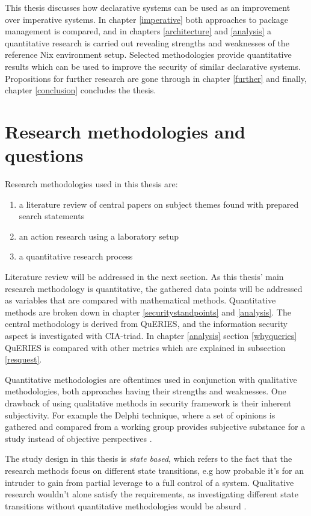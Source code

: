 This thesis discusses how declarative systems can be used as an improvement over imperative systems. In chapter \ref{imperative} both approaches to package management is compared, and in chapters \ref{architecture} and \ref{analysis} a quantitative research is carried out revealing strengths and weaknesses of the reference Nix environment setup. Selected methodologies provide quantitative results which can be used to improve the security of similar declarative systems. Propositions for further research are gone through in chapter \ref{further} and finally, chapter \ref{conclusion} concludes the thesis.

\section{Research methodologies and questions}

Research methodologies used in this thesis are:
\begin{enumerate}
\item a literature review of central papers on subject themes found with prepared search statements
\item an action research using a laboratory setup
\item a quantitative research process
\end{enumerate}

Literature review will be addressed in the next section. As this thesis' main research methodology is quantitative, the gathered data points will be addressed as variables that are compared with mathematical methods. Quantitative methods are broken down in chapter \ref{securitystandpoints} and \ref{analysis}. The central methodology is derived from QuERIES, and the information security aspect is investigated with CIA-triad. In chapter \ref{analysis} section \ref{whyqueries} QuERIES is compared with other metrics which are explained in subsection \ref{resquest}.

Quantitative methodologies are oftentimes used in conjunction with qualitative methodologies, both approaches having their strengths and weaknesses. One drawback of using qualitative methods in security framework is their inherent subjectivity. For example the Delphi technique, where a set of opinions is gathered and compared from a working group provides subjective substance for a study instead of objective perspectives \cite{wang2005information}.

The study design in this thesis is \textit{state based}, which refers to the fact that the research methods focus on different state transitions, e.g how probable it's for an intruder to gain from partial leverage to a full control of a system. Qualitative research wouldn't alone satisfy the requirements, as investigating different state transitions without quantitative methodologies would be absurd \cite{ramos2017model}.

